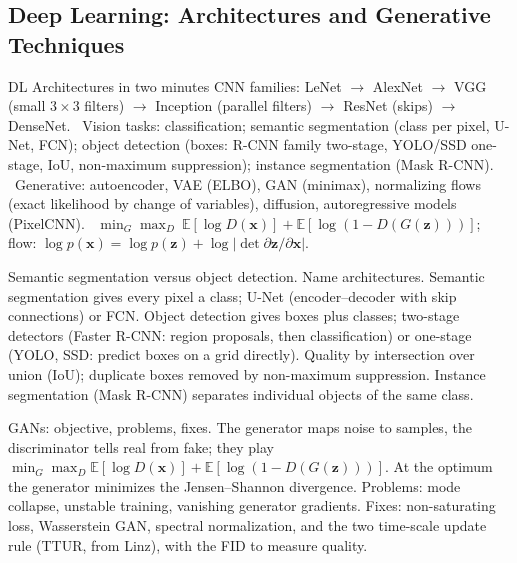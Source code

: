 \subsection{Deep Learning: Architectures and Generative Techniques}

\begin{summary}{DL Architectures in two minutes}
\textsf{CNN families:} LeNet $\to$ AlexNet $\to$ VGG (small $3\times3$ filters) $\to$ Inception
(parallel filters) $\to$ ResNet (skips) $\to$ DenseNet. \
\textsf{Vision tasks:} classification; semantic segmentation (class per pixel, U-Net, FCN);
object detection (boxes: R-CNN family two-stage, YOLO/SSD one-stage, IoU, non-maximum suppression);
instance segmentation (Mask R-CNN). \
\textsf{Generative:} autoencoder, VAE (ELBO), GAN (minimax), normalizing flows (exact likelihood by
change of variables), diffusion, autoregressive models (PixelCNN). \
$\min_G\max_D\ \mathbb{E}[\log D(\mathbf{x})]+\mathbb{E}[\log(1-D(G(\mathbf{z})))]$;\quad
flow: $\log p(\mathbf{x})=\log p(\mathbf{z})+\log\lvert\det\partial\mathbf{z}/\partial\mathbf{x}\rvert$.
\end{summary}


\begin{qabox}[Klambauer]{\pred Semantic segmentation versus object detection. Name architectures.}
\ans Semantic segmentation gives every pixel a class; U-Net (encoder--decoder with skip
connections) or FCN. Object detection gives boxes plus classes; two-stage detectors (Faster R-CNN:
region proposals, then classification) or one-stage (YOLO, SSD: predict boxes on a grid directly).
Quality by intersection over union (IoU); duplicate boxes removed by non-maximum suppression.
Instance segmentation (Mask R-CNN) separates individual objects of the same class.
\end{qabox}

\begin{qabox}[Klambauer]{\pred GANs: objective, problems, fixes.}
\ans The generator maps noise to samples, the discriminator tells real from fake; they play
$\min_G\max_D\mathbb{E}[\log D(\mathbf{x})]+\mathbb{E}[\log(1-D(G(\mathbf{z})))]$. At the optimum the
generator minimizes the Jensen--Shannon divergence. Problems: mode collapse, unstable training,
vanishing generator gradients. Fixes: non-saturating loss, Wasserstein GAN, spectral normalization,
and the two time-scale update rule (TTUR, from Linz), with the FID to measure quality.
\end{qabox}

